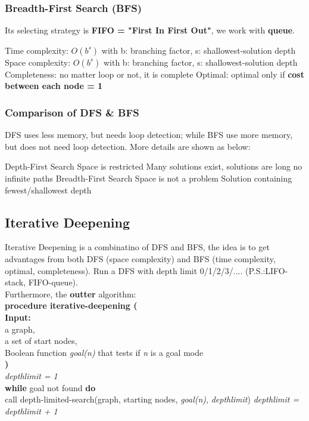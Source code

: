 \subsubsection{Breadth-First Search (BFS)}
Its selecting strategy is \textbf{FIFO = "First In First Out"}, we work with \textbf{queue}.
\begin{outline}
    \1 Time complexity: $O(b^{s})$
        \2 with b: branching factor, s: shallowest-solution depth
    \1 Space complexity: $O(b^{s})$
        \2 with b: branching factor, s: shallowest-solution depth
    \1 Completeness: no matter loop or not, it is complete
    \1 Optimal: optimal only if \textbf{cost between each node = 1}
\end{outline}

\subsubsection{Comparison of DFS \& BFS}
DFS uses less memory, but needs loop detection; while BFS use more memory, but does not need loop detection. More details are shown as below: \\
\begin{outline}
    \1 Depth-First Search
        \2 Space is restricted
        \2 Many solutions exist, solutions are long
        \2 no infinite paths
    \1 Breadth-First Search
        \2 Space is not a problem
        \2 Solution containing fewest/shallowest depth
\end{outline}

\subsection{Iterative Deepening}
Iterative Deepening is a combinatino of DFS and BFS, the idea is to get advantages from both DFS (space complexity) and BFS (time complexity, optimal, completeness). Run a DFS with depth limit 0/1/2/3/.... (P.S.:LIFO-stack, FIFO-queue). \\
Furthermore, the \textbf{outter} algorithm: \\
\textbf{procedure iterative-deepening (} \\
\tabto{5mm} \textbf{Input:}  \\
\tabto{5mm} a graph, \\
\tabto{5mm} a set of start nodes, \\
\tabto{5mm} Boolean function \emph{goal(n)} that tests if \emph{n} is a goal mode \\
\textbf{)} \\
\emph{depthlimit = 1} \\
\textbf{while} goal not found \textbf{do} \\
\tabto{5mm} call depth-limited-search(graph, starting nodes, \emph{goal(n)}, \emph{depthlimit})
\tabto{5mm} \emph{depthlimit = depthlimit + 1} \\

